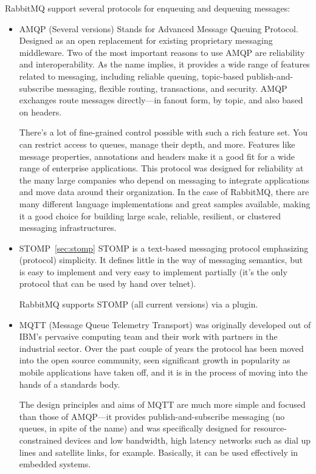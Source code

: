 RabbitMQ support several protocols for enqueuing and dequeuing messages:
\begin{itemize}
  \item AMQP (Several versions)
  Stands for Advanced Message Queuing Protocol. Designed as an open replacement for existing proprietary messaging middleware. Two of the most important reasons to use AMQP are reliability and interoperability. As the name implies, it provides a wide range of features related to messaging, including reliable queuing, topic-based publish-and-subscribe messaging, flexible routing, transactions, and security. AMQP exchanges route messages directly—in fanout form, by topic, and also based on headers.\cite{andyPiperVmware}

  There’s a lot of fine-grained control possible with such a rich feature set. You can restrict access to queues, manage their depth, and more. Features like message properties, annotations and headers make it a good fit for a wide range of enterprise applications. This protocol was designed for reliability at the many large companies who depend on messaging to integrate applications and move data around their organization. In the case of RabbitMQ, there are many different language implementations and great samples available, making it a good choice for building large scale, reliable, resilient, or clustered messaging infrastructures.

  \item STOMP~\ref{sec:stomp}
  STOMP is a text-based messaging protocol emphasizing (protocol) simplicity. It defines little in the way of messaging semantics, but is easy to implement and very easy to implement partially (it's the only protocol that can be used by hand over telnet).

  RabbitMQ supports STOMP (all current versions) via a plugin.
  \item MQTT
  (Message Queue Telemetry Transport) was originally developed out of IBM’s pervasive computing team and their work with partners in the industrial sector. Over the past couple of years the protocol has been moved into the open source community, seen significant growth in popularity as mobile applications have taken off, and it is in the process of moving into the hands of a standards body.

  The design principles and aims of MQTT are much more simple and focused than those of AMQP—it provides publish-and-subscribe messaging (no queues, in spite of the name) and was specifically designed for resource-constrained devices and low bandwidth, high latency networks such as dial up lines and satellite links, for example. Basically, it can be used effectively in embedded systems. \cite{andyPiperVmware}


\end{itemize}

